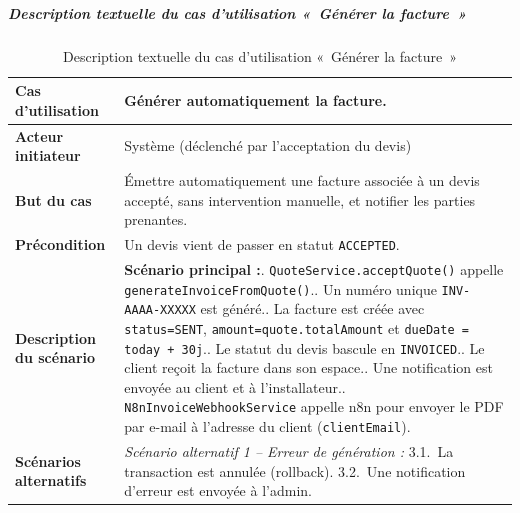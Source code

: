 \subparagraph{Description textuelle du cas d'utilisation «~Générer la facture~»}

\begin{table}[H]
  \caption{Description textuelle du cas d'utilisation «~Générer la facture~»}
  \label{tab:cu-generer-facture}
  \centering
  \begin{tabularx}{\textwidth}{|L{3.8cm}|X|}
    \hline
    \textbf{Cas d'utilisation} & Générer automatiquement la facture. \\
    \hline
    \textbf{Acteur initiateur} & Système (déclenché par l'acceptation du devis) \\
    \hline
    \textbf{But du cas} & Émettre automatiquement une facture associée à un devis accepté, sans intervention manuelle, et notifier les parties prenantes. \\
    \hline
    \textbf{Précondition} & Un devis vient de passer en statut \texttt{ACCEPTED}. \\
    \hline
    \textbf{Description du scénario} &
    \textbf{Scénario principal :}. \texttt{QuoteService.acceptQuote()} appelle \texttt{generateInvoiceFromQuote()}.. Un numéro unique \texttt{INV-AAAA-XXXXX} est généré.. La facture est créée avec \texttt{status=SENT}, \texttt{amount=quote.totalAmount} et \texttt{dueDate = today + 30j}.. Le statut du devis bascule en \texttt{INVOICED}.. Le client reçoit la facture dans son espace.. Une notification est envoyée au client et à l'installateur.. \texttt{N8nInvoiceWebhookService} appelle n8n pour envoyer le PDF par
    e-mail à l'adresse du client (\texttt{clientEmail}).\\
    \hline
    \textbf{Scénarios alternatifs} &
    \textit{Scénario alternatif 1 -- Erreur de génération :}\newline
    \hspace*{6pt}3.1.~La transaction est annulée (rollback).\newline
    \hspace*{6pt}3.2.~Une notification d'erreur est envoyée à l'admin.\\
    \hline
  \end{tabularx}
\end{table}

